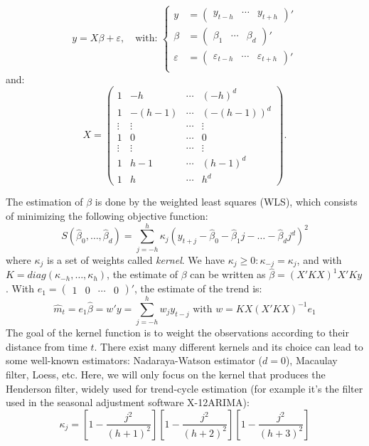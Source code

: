 \documentclass[fleqn,10pt]{latex/stylish_article} %
\newcommand\1{\mathds{1}}
\begin{document}
\[
y=X\beta+\varepsilon,\quad \text{with: }
\begin{cases}
y&=\begin{pmatrix}y_{t-h} & \cdots &y_{t+h}\end{pmatrix}'\\
\beta &=\begin{pmatrix}\beta_1 & \cdots &\beta_d \end{pmatrix}'\\
\varepsilon&=\begin{pmatrix}\varepsilon_{t-h} & \cdots &\varepsilon_{t+h}\end{pmatrix}'\\
\end{cases}
\]
and:
\[
X=\begin{pmatrix}1 & -h & \cdots & (-h)^{d}\\
1 & -(h-1) & \cdots & (-(h-1))^{d}\\
\vdots & \vdots & \cdots & \vdots\\
1 & 0 &  \cdots & 0\\
\vdots  & \vdots & \cdots & \vdots\\
1 & h-1  & \cdots & (h-1)^{d}\\
1 & h  & \cdots & h^{d}
\end{pmatrix}.
\]

The estimation of \(\beta\) is done by the weighted least squares (WLS), which consists of minimizing the following objective function:
\[
S(\hat{\beta}_{0},\dots,\hat{\beta}_{d})=\sum_{j=-h}^{h}\kappa_{j}(y_{t+j}-\hat{\beta}_{0}-\hat{\beta}_{1}j-\dots-\hat{\beta}_{d}j^{d})^{2}
\]
where \(\kappa_j\) is a set of weights called \emph{kernel}. We have \(\kappa_j\geq 0:\kappa_{-j}=\kappa_j\), and with \(K=diag(\kappa_{-h},\dots,\kappa_{h})\), the estimate of \(\beta\) can be written as \(\hat{\beta}=(X'KX)^{1}X'Ky\).
With \(e_{1}=\begin{pmatrix}1&0&\cdots&0\end{pmatrix}'\), the estimate of the trend is:
\[
\hat{m}_{t}=e_{1}\hat{\beta}=w'y=\sum_{j=-h}^{h}w_{j}y_{t-j}\text{ with }w=KX(X'KX)^{-1}e_{1}
\]
The goal of the kernel function is to weight the observations according to their distance from time \(t\). There exist many different kernels and its choice can lead to some well-known estimators: Nadaraya-Watson estimator (\(d=0\)), Macaulay filter, Loess, etc. Here, we will only focus on the kernel that produces the Henderson filter, widely used for trend-cycle estimation (for example it's the filter used in the seasonal adjustment software X-12ARIMA):
\[\kappa_{j}=\left[1-\frac{j^2}{(h+1)^2}\right]
\left[1-\frac{j^2}{(h+2)^2}\right]
\left[1-\frac{j^2}{(h+3)^2}\right]\]
\end{document}
